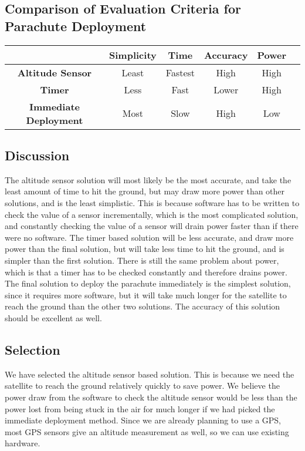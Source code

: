\documentclass[10pt,letterpaper,onecolumn,journal]{IEEEtran}
\begin{document}
\subsection*{Comparison of Evaluation Criteria for Parachute Deployment}
\begin{center}
  \begin{tabular}{cccccc}
    \hline
    \multicolumn{1}{l}{} & \textbf{Simplicity} & \textbf{Time}    & \textbf{Accuracy} & \textbf{Power}\\
    \hline
    \textbf{Altitude Sensor}      & Least      & Fastest & High     & High\\
    \hline
    \textbf{Timer}                & Less       & Fast    & Lower    & High\\
    \hline
    \textbf{Immediate Deployment} & Most       & Slow    & High     & Low\\
    \hline
  \end{tabular}
\end{center}
\vspace{.3cm}

\subsection{Discussion}
The altitude sensor solution will most likely be the most accurate, and take the least amount of time to hit the ground, but may draw more power than other solutions, and is the least simplistic. This is because software has to be written to check the value of a sensor incrementally, which is the most complicated solution, and constantly checking the value of a sensor will drain power faster than if there were no software. The timer based solution will be less accurate, and draw more power than the final solution, but will take less time to hit the ground, and is simpler than the first solution. There is still the same problem about power, which is that a timer has to be checked constantly and therefore drains power. The final solution to deploy the parachute immediately is the simplest solution, since it requires more software, but it will take much longer for the satellite to reach the ground than the other two solutions. The accuracy of this solution should be excellent as well.

\subsection{Selection}
We have selected the altitude sensor based solution. This is because we need the satellite to reach the ground relatively quickly to save power. We believe the power draw from the software to check the altitude sensor would be less than the power lost from being stuck in the air for much longer if we had picked the immediate deployment method. Since we are already planning to use a GPS, most GPS sensors give an altitude measurement as well, so we can use existing hardware. 
	
\end{document}
